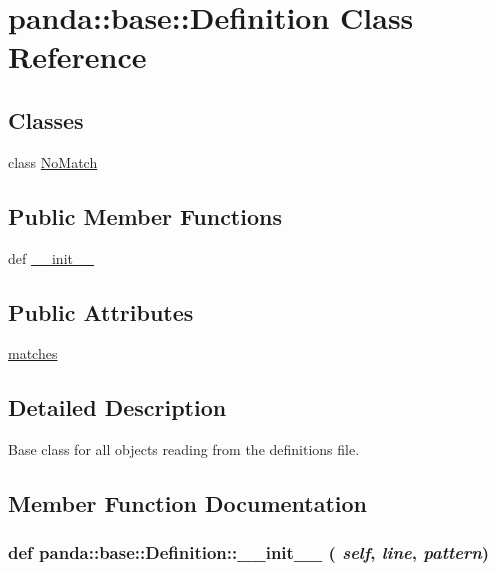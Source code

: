 \hypertarget{classpanda_1_1base_1_1Definition}{
\section{panda::base::Definition Class Reference}
\label{classpanda_1_1base_1_1Definition}
}
\subsection*{Classes}
\begin{DoxyCompactItemize}
\item 
class \hyperlink{classpanda_1_1base_1_1Definition_1_1NoMatch}{NoMatch}
\end{DoxyCompactItemize}
\subsection*{Public Member Functions}
\begin{DoxyCompactItemize}
\item 
def \hyperlink{classpanda_1_1base_1_1Definition_a70549a03d706a89a7457d60e7a98d7b7}{\_\-\_\-init\_\-\_\-}
\end{DoxyCompactItemize}
\subsection*{Public Attributes}
\begin{DoxyCompactItemize}
\item 
\hyperlink{classpanda_1_1base_1_1Definition_af1a606bda27e895cab03785d996c8545}{matches}
\end{DoxyCompactItemize}


\subsection{Detailed Description}
\begin{DoxyVerb}
Base class for all objects reading from the definitions file.
\end{DoxyVerb}
 

\subsection{Member Function Documentation}
\hypertarget{classpanda_1_1base_1_1Definition_a70549a03d706a89a7457d60e7a98d7b7}{
\subsubsection[{\_\-\_\-init\_\-\_\-}]{\setlength{\rightskip}{0pt plus 5cm}def panda::base::Definition::\_\-\_\-init\_\-\_\- ( {\em self}, \/   {\em line}, \/   {\em pattern})}}
\label{classpanda_1_1base_1_1Definition_a70549a03d706a89a7457d60e7a98d7b7}


